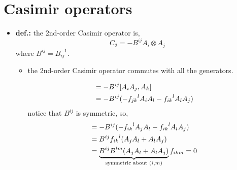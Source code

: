 \section{Casimir operators}
\begin{itemize}
	\item \textbf{\textbf{def.:}} the 2nd-order Casimir operator is,
	\begin{equation}
		C_2 = - B^{i j} A_i \otimes A_j
	\end{equation}
	where $B^{i j} = B^{- 1}_{i j}$.
	\begin{itemize}
		\item the 2nd-order Casimir operator commutes with all the generators.
		
		\begin{tcolorbox}[title=proof:]
			\begin{align}
				[C_2, A_k] &= - B^{i j} [A_i A_j, A_k] \notag \\
				&= - B^{i j} (- {f_{j k}}^l A_i A_l - {f_{i k}}^l A_l A_j)
			\end{align}
			notice that $B^{i j}$ is symmetric, so,
			\begin{align}
				[C_2, A_k] &= - B^{i j} (- {f_{i k}}^l A_j A_l - {f_{i k}}^l A_l A_j) \notag \\
				&= B^{i j} {f_{i k}}^l (A_j A_l + A_l A_j) \notag \\
				&= \underbrace{B^{i j} B^{l m} (A_j A_l + A_l A_j)}_{\text{symmetric about } (i, m)} f_{i k m} = 0
			\end{align}
		\end{tcolorbox}
	\end{itemize}
\end{itemize}
